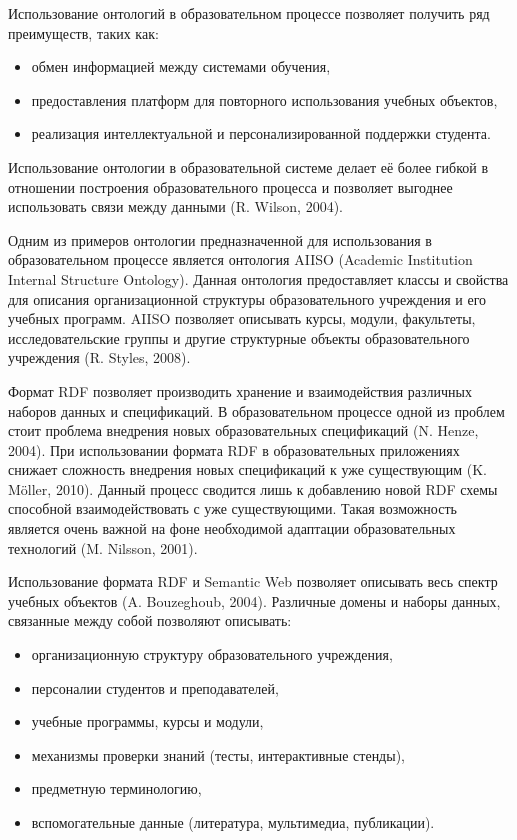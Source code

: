 Использование онтологий в образовательном процессе позволяет получить ряд преимуществ, таких как:
\begin{itemize}
\item обмен информацией между системами обучения, 
\item предоставления платформ для повторного использования учебных объектов,
\item реализация интеллектуальной и персонализированной поддержки студента.
\end{itemize}

Использование онтологии в образовательной системе делает её более гибкой в отношении построения образовательного процесса и позволяет выгоднее использовать связи между данными (R. Wilson, 2004).

Одним из примеров онтологии предназначенной для использования в образовательном процессе является онтология AIISO (Academic Institution Internal Structure Ontology). Данная онтология предоставляет классы и свойства для описания организационной структуры образовательного учреждения и его учебных программ. AIISO позволяет описывать курсы, модули, факультеты, исследовательские группы и другие структурные объекты образовательного учреждения (R. Styles, 2008). 

Формат RDF позволяет производить хранение и взаимодействия различных наборов данных и спецификаций. В образовательном процессе одной из проблем стоит проблема внедрения новых образовательных спецификаций (N. Henze, 2004). При использовании формата RDF в образовательных приложениях снижает сложность внедрения новых спецификаций к уже существующим (K. Möller, 2010). Данный процесс сводится лишь к добавлению новой RDF схемы способной взаимодействовать с уже существующими. Такая возможность является очень важной на фоне необходимой адаптации образовательных технологий (M. Nilsson, 2001). 

Использование формата RDF и Semantic Web позволяет описывать весь спектр учебных объектов (A. Bouzeghoub, 2004). Различные домены и наборы данных, связанные между собой позволяют описывать:

\begin{itemize}
\item организационную структуру образовательного учреждения,
\item персоналии студентов и преподавателей,
\item учебные программы, курсы и модули,
\item механизмы проверки знаний (тесты, интерактивные стенды),
\item предметную терминологию,
\item вспомогательные данные (литература, мультимедиа, публикации).
\end{itemize}


